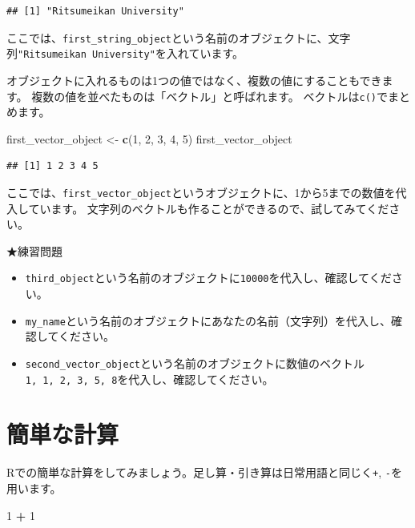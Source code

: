 \documentclass[]{book}
\newenvironment{Shaded}{\begin{snugshade}}{\end{snugshade}}
\newcommand{\KeywordTok}[1]{\textcolor[rgb]{0.13,0.29,0.53}{\textbf{#1}}}
\newcommand{\DecValTok}[1]{\textcolor[rgb]{0.00,0.00,0.81}{#1}}
\newcommand{\StringTok}[1]{\textcolor[rgb]{0.31,0.60,0.02}{#1}}
\newcommand{\OperatorTok}[1]{\textcolor[rgb]{0.81,0.36,0.00}{\textbf{#1}}}
\newcommand{\NormalTok}[1]{#1}
\providecommand{\tightlist}{%
  \setlength{\itemsep}{0pt}\setlength{\parskip}{0pt}}
\begin{document}
\begin{verbatim}
## [1] "Ritsumeikan University"
\end{verbatim}

ここでは、\texttt{first\_string\_object}という名前のオブジェクトに、文字列\texttt{"Ritsumeikan\ University"}を入れています。

オブジェクトに入れるものは1つの値ではなく、複数の値にすることもできます。
複数の値を並べたものは「ベクトル」と呼ばれます。
ベクトルは\texttt{c()}でまとめます。

\begin{Shaded}
\begin{Highlighting}[]
\NormalTok{first_vector_object <-}\StringTok{ }\KeywordTok{c}\NormalTok{(}\DecValTok{1}\NormalTok{, }\DecValTok{2}\NormalTok{, }\DecValTok{3}\NormalTok{, }\DecValTok{4}\NormalTok{, }\DecValTok{5}\NormalTok{)}
\NormalTok{first_vector_object}
\end{Highlighting}
\end{Shaded}

\begin{verbatim}
## [1] 1 2 3 4 5
\end{verbatim}

ここでは、\texttt{first\_vector\_object}というオブジェクトに、1から5までの数値を代入しています。
文字列のベクトルも作ることができるので、試してみてください。

★練習問題

\begin{itemize}
\tightlist
\item
  \texttt{third\_object}という名前のオブジェクトに\texttt{10000}を代入し、確認してください。
\item
  \texttt{my\_name}という名前のオブジェクトにあなたの名前（文字列）を代入し、確認してください。
\item
  \texttt{second\_vector\_object}という名前のオブジェクトに数値のベクトル\texttt{1,\ 1,\ 2,\ 3,\ 5,\ 8}を代入し、確認してください。
\end{itemize}

\section{簡単な計算}\label{ux7c21ux5358ux306aux8a08ux7b97}

Rでの簡単な計算をしてみましょう。足し算・引き算は日常用語と同じく\texttt{+},
\texttt{-}を用います。

\begin{Shaded}
\begin{Highlighting}[]
\DecValTok{1} \OperatorTok{+}\StringTok{ }\DecValTok{1}
\end{Highlighting}
\end{Shaded}
\end{document}
